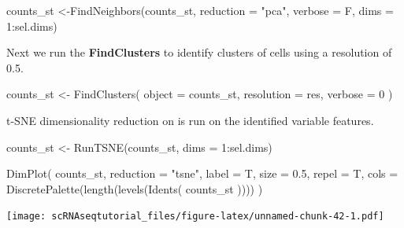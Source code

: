 \documentclass[
  openany]{book}
\newenvironment{Shaded}{\begin{snugshade}}{\end{snugshade}}
\newcommand{\AttributeTok}[1]{\textcolor[rgb]{0.77,0.63,0.00}{#1}}
\newcommand{\DecValTok}[1]{\textcolor[rgb]{0.00,0.00,0.81}{#1}}
\newcommand{\FloatTok}[1]{\textcolor[rgb]{0.00,0.00,0.81}{#1}}
\newcommand{\FunctionTok}[1]{\textcolor[rgb]{0.00,0.00,0.00}{#1}}
\newcommand{\NormalTok}[1]{#1}
\newcommand{\OtherTok}[1]{\textcolor[rgb]{0.56,0.35,0.01}{#1}}
\newcommand{\SpecialCharTok}[1]{\textcolor[rgb]{0.00,0.00,0.00}{#1}}
\newcommand{\StringTok}[1]{\textcolor[rgb]{0.31,0.60,0.02}{#1}}
\begin{document}
\begin{Shaded}
\begin{Highlighting}[]
\NormalTok{counts\_st }\OtherTok{\textless{}{-}}\FunctionTok{FindNeighbors}\NormalTok{(counts\_st,}
                \AttributeTok{reduction =} \StringTok{"pca"}\NormalTok{,}
                \AttributeTok{verbose =}\NormalTok{ F,}
                \AttributeTok{dims =} \DecValTok{1}\SpecialCharTok{:}\NormalTok{sel.dims)}
\end{Highlighting}
\end{Shaded}

Next we run the \textbf{FindClusters} to identify clusters of cells using a resolution of 0.5.

\begin{Shaded}
\begin{Highlighting}[]
\NormalTok{counts\_st }\OtherTok{\textless{}{-}}
  \FunctionTok{FindClusters}\NormalTok{(}
    \AttributeTok{object =}\NormalTok{ counts\_st,}
    \AttributeTok{resolution =}\NormalTok{ res,}
    \AttributeTok{verbose =} \DecValTok{0}
\NormalTok{  )}
\end{Highlighting}
\end{Shaded}

t-SNE dimensionality reduction on is run on the identified variable features.

\begin{Shaded}
\begin{Highlighting}[]
\NormalTok{counts\_st }\OtherTok{\textless{}{-}} \FunctionTok{RunTSNE}\NormalTok{(counts\_st, }\AttributeTok{dims =} \DecValTok{1}\SpecialCharTok{:}\NormalTok{sel.dims)}
\end{Highlighting}
\end{Shaded}

\begin{Shaded}
\begin{Highlighting}[]
\FunctionTok{DimPlot}\NormalTok{(}
\NormalTok{  counts\_st,}
  \AttributeTok{reduction =} \StringTok{"tsne"}\NormalTok{,}
  \AttributeTok{label =}\NormalTok{ T,}
  \AttributeTok{size =} \FloatTok{0.5}\NormalTok{,}
  \AttributeTok{repel =}\NormalTok{ T,}
  \AttributeTok{cols =} \FunctionTok{DiscretePalette}\NormalTok{(}\FunctionTok{length}\NormalTok{(}\FunctionTok{levels}\NormalTok{(}\FunctionTok{Idents}\NormalTok{(}
\NormalTok{    counts\_st}
\NormalTok{  ))))}
\NormalTok{)}
\end{Highlighting}
\end{Shaded}

\texttt{[image: scRNAseqtutorial\_files/figure-latex/unnamed-chunk-42-1.pdf]}
\end{document}
